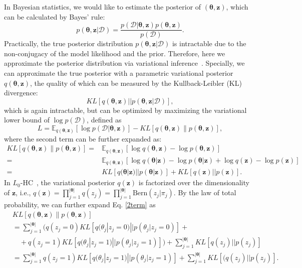 \documentclass[runningheads, envcountsame, a4paper]{llncs}
\def\bs{\boldsymbol}
\begin{document}
In Bayesian statistics, we would like to estimate the posterior of $(\bs{\theta}, \bs{z})$, which can be calculated by Bayes' rule:
\begin{equation}
  p(\bs\theta, \bs{z} | \mathcal{D}) = \frac{p(\mathcal{D}|\bs{\theta},\bs{z}) p(\bs{\theta},\bs{z})}{p(\mathcal{D})}.
\end{equation}
Practically, the true posterior distribution $p(\bs{\theta},\bs{z}|\mathcal{D})$ is intractable due to the non-conjugacy of the model likelihood and the prior. Therefore, here we approximate the posterior distribution via variational inference~\cite{viBlei}. Specially, we can approximate the true posterior with a parametric variational posterior $q(\bs{\theta},\bs{z})$, the quality of which can be measured by the Kullback-Leibler (KL) divergence: 
\begin{equation} \label{eq: KL}
  KL[q (\bs{\theta}, \bs{z}) || p(\bs{\theta}, \bs{z} | \mathcal{D})],
\end{equation}
which is again intractable, but can be optimized by maximizing the variational lower bound of $\log p(\mathcal{D})$, defined as
\begin{equation} \label{eq: lowerbound}
  L= \mathbb{E}_{q(\bs{\theta}, \bs{z})}[\log p(\mathcal{D} | \bs{\theta}, \bs{z})] - KL[q(\bs{\theta},\bs{z}) \| p(\bs{\theta},\bs{z})],
\end{equation}
where the second term can be further expanded as:
  \begin{align} \label{2term}
  KL[q(\bs{\theta}, \bs{z}) \| p(\bs{\theta}, \bs{z})]
  = &\mathbb{E}_{q(\bs{\theta}, \bs{z})} [\log{q (\bs{\theta}, \bs{z})} - \log{p(\bs{\theta},\bs{z})}]\nonumber\\
    = &\mathbb{E}_{q(\bs{\theta},\bs{z})} [\log{q (\bs{\theta} | \bs{z})} - \log{p(\bs{\theta} | \bs{z})} + \log{q(\bs{z})-\log p(\bs{z})}]\nonumber\\
    = & KL[q(\bs{\theta} | \bs{z}) || p(\bs{\theta} | \bs{z})] + KL[q(\bs{z}) || p(\bs{z})].
  \end{align}
 In $L_0$-HC~\cite{louizos2017learning}, the variational posterior $q(\bs{z})$ is factorized over the dimensionality of $\bs{z}$, i.e., $q(\bs{z})=\prod_{j=1}^{|\bs{\theta}|}q(z_j)=\prod_{j=1}^{|\bs{\theta}|}\text{Bern}(z_j|\pi_j)$. By the law of total probability, we can further expand Eq. \ref{2term} as
    \begin{align} \label{2term2}
    &KL[q(\bs{\theta}, \bs{z}) \| p(\bs{\theta}, \bs{z})]\nonumber \\
    & = \sum_{j=1}^{|\bs{\theta}|} \Big( q(z_j=0)KL[q(\theta_j | z_j=0) || p(\theta_j | z_j=0)] + \nonumber\\
    & \quad + q(z_j=1)KL[q(\theta_j | z_j=1) || p(\theta_j | z_j=1)]\Big) +\sum_{j=1}^{|\bs{\theta}|} KL[q(z_j)|| p(z_j)]\nonumber\\
    &=\sum_{j=1}^{|\bs{\theta}|} q(z_j=1)KL[q(\theta_j | z_j=1) || p(\theta_j | z_j=1)] + \sum_{j=1}^{|\bs{\theta}|} KL[(q(z_j)|| p(z_j)].
  \end{align}
\end{document}
